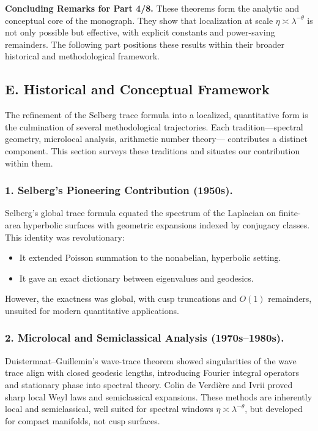 \medskip

\noindent\textbf{Concluding Remarks for Part 4/8.}
These theorems form the analytic and conceptual core of the monograph.
They show that localization at scale $\eta\asymp\lambda^{-\theta}$
is not only possible but effective,
with explicit constants and power-saving remainders.
The following part positions these results within their broader
historical and methodological framework.


\subsection*{E. Historical and Conceptual Framework}

The refinement of the Selberg trace formula into a localized, quantitative form
is the culmination of several methodological trajectories.
Each tradition—spectral geometry, microlocal analysis, arithmetic number theory—
contributes a distinct component. This section surveys these traditions
and situates our contribution within them.

\subsubsection*{1. Selberg’s Pioneering Contribution (1950s).}
Selberg’s global trace formula \cite{Selberg1956} equated the spectrum of the Laplacian
on finite-area hyperbolic surfaces with geometric expansions indexed by conjugacy classes.
This identity was revolutionary:
\begin{itemize}
  \item It extended Poisson summation to the nonabelian, hyperbolic setting.
  \item It gave an exact dictionary between eigenvalues and geodesics.
\end{itemize}
However, the exactness was global, with cusp truncations and $O(1)$ remainders,
unsuited for modern quantitative applications.

\subsubsection*{2. Microlocal and Semiclassical Analysis (1970s–1980s).}
Duistermaat–Guillemin’s wave-trace theorem \cite{DG1975}
showed singularities of the wave trace align with closed geodesic lengths,
introducing Fourier integral operators and stationary phase into spectral theory.
Colin de Verdière \cite{Colin1978} and Ivrii \cite{Ivrii1980}
proved sharp local Weyl laws and semiclassical expansions.
These methods are inherently local and semiclassical,
well suited for spectral windows $\eta\asymp \lambda^{-\theta}$,
but developed for compact manifolds, not cusp surfaces.

